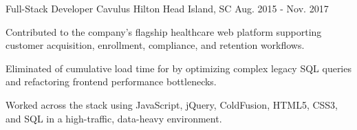 \begin{cventries}
  \cventry
    {Full-Stack Developer} %
    {Cavulus} %
    {Hilton Head Island, SC} %
    {Aug. 2015 - Nov. 2017} %
    {
      \begin{cvitems} %
        \item {Contributed to the company's flagship healthcare web platform supporting customer acquisition, enrollment, compliance, and retention workflows.}
        \item {Eliminated  of cumulative load time for  by optimizing complex legacy SQL queries and refactoring frontend performance bottlenecks.}
        \item {Worked across the stack using JavaScript, jQuery, ColdFusion, HTML5, CSS3, and SQL in a high-traffic, data-heavy environment.}

\end{cvitems}}
\end{cventries}
